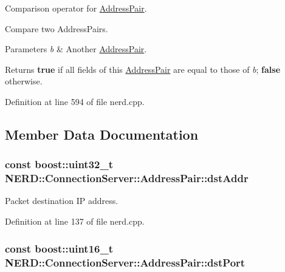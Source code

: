 \-Comparison operator for \hyperlink{structNERD_1_1ConnectionServer_1_1AddressPair}{\-Address\-Pair}. 

\-Compare two \-Address\-Pairs. 
\begin{DoxyParams}{\-Parameters}
{\em b} & \-Another \hyperlink{structNERD_1_1ConnectionServer_1_1AddressPair}{\-Address\-Pair}. \\
\hline
\end{DoxyParams}
\begin{DoxyReturn}{\-Returns}
{\bfseries true} if all fields of this \hyperlink{structNERD_1_1ConnectionServer_1_1AddressPair}{\-Address\-Pair} are equal to those of {\itshape b\/}; {\bfseries false} otherwise. 
\end{DoxyReturn}


\-Definition at line 594 of file nerd.\-cpp.



\subsection{\-Member \-Data \-Documentation}
\hypertarget{structNERD_1_1ConnectionServer_1_1AddressPair_a820ebb84f573dc37a49261ab707d435f}{
\subsubsection[{dst\-Addr}]{\setlength{\rightskip}{0pt plus 5cm}const boost\-::uint32\-\_\-t {\bf \-N\-E\-R\-D\-::\-Connection\-Server\-::\-Address\-Pair\-::dst\-Addr}}}
\label{structNERD_1_1ConnectionServer_1_1AddressPair_a820ebb84f573dc37a49261ab707d435f}


\-Packet destination \-I\-P address. 



\-Definition at line 137 of file nerd.\-cpp.

\hypertarget{structNERD_1_1ConnectionServer_1_1AddressPair_ad2962570ad683405d91087e11f78aeea}{
\subsubsection[{dst\-Port}]{\setlength{\rightskip}{0pt plus 5cm}const boost\-::uint16\-\_\-t {\bf \-N\-E\-R\-D\-::\-Connection\-Server\-::\-Address\-Pair\-::dst\-Port}}}
\label{structNERD_1_1ConnectionServer_1_1AddressPair_ad2962570ad683405d91087e11f78aeea}



